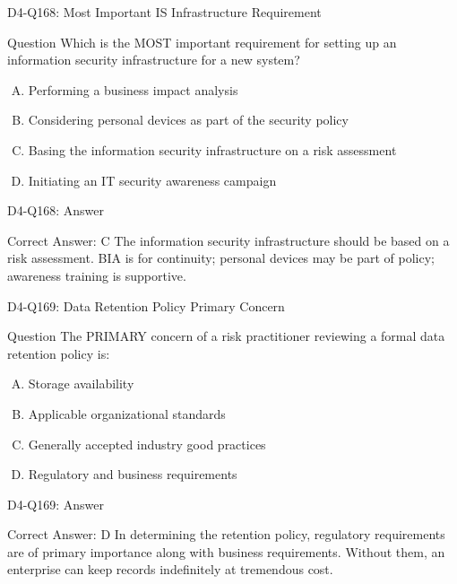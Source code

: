 \documentclass{beamer}
\begin{document}
	\begin{frame}{D4-Q168: Most Important IS Infrastructure Requirement}
		\begin{block}{Question}
			Which is the MOST important requirement for setting up an information security infrastructure for a new system?
		\end{block}
		\begin{enumerate}[(A)]
			\item Performing a business impact analysis
			\item Considering personal devices as part of the security policy
			\item Basing the information security infrastructure on a risk assessment
			\item Initiating an IT security awareness campaign
		\end{enumerate}
	\end{frame}
	\begin{frame}{D4-Q168: Answer}
		\begin{block}{Correct Answer: C}
			The information security infrastructure should be based on a risk assessment. BIA is for continuity; personal devices may be part of policy; awareness training is supportive.
		\end{block}
	\end{frame}
	
	\begin{frame}{D4-Q169: Data Retention Policy Primary Concern}
		\begin{block}{Question}
			The PRIMARY concern of a risk practitioner reviewing a formal data retention policy is:
		\end{block}
		\begin{enumerate}[(A)]
			\item Storage availability
			\item Applicable organizational standards
			\item Generally accepted industry good practices
			\item Regulatory and business requirements
		\end{enumerate}
	\end{frame}
	\begin{frame}{D4-Q169: Answer}
		\begin{block}{Correct Answer: D}
			In determining the retention policy, regulatory requirements are of primary importance along with business requirements. Without them, an enterprise can keep records indefinitely at tremendous cost.
		\end{block}
	\end{frame}
	
\end{document}

